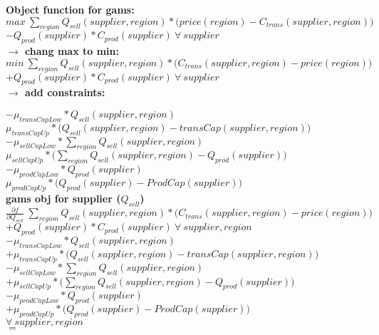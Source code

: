 \documentclass{article}
\begin{document}
\textbf{Object function for gams:}\\
\quad$ max\:\sum_{region} Q_{sell}(supplier, region) *\Big(price(region) - C_{trans}(supplier,region)\Big) $\\
\quad$- Q_{prod}(supplier)*C_{prod}(supplier)\:\forall\: supplier $\\

\textbf{$\rightarrow$ chang max to min:}\\

\quad$ min\:\sum_{region} Q_{sell}(supplier, region) *\Big(C_{trans}(supplier,region) - price(region)\Big) $\\
\quad$+ Q_{prod}(supplier)*C_{prod}(supplier)\:\forall\: supplier$ \\

\textbf{$\rightarrow$ add constraints:}

\quad$	- \mu_{transCapLow} * Q_{sell}(supplier, region)$\\
\quad$\mu_{transCapUp} *\Big( Q_{sell}(supplier, region) - transCap(supplier, region)\Big)$\\
\quad$ -\mu_{sellCapLow} * \sum_{region} Q_{sell}(supplier, region)$\\
\quad$	 \mu_{sellCapUp}*\Big(\sum_{region} Q_{sell}(supplier, region) -  Q_{prod}(supplier) \Big)$\\
\quad$	- \mu_{prodCapLow} * Q_{prod}(supplier)$\\
\quad$ \mu_{prodCapUp}*\Big(Q_{prod}(supplier) - ProdCap(supplier)\Big)	$\\


	



\textbf{gams obj for supplier ($Q_{sell}$)}\\
\quad$\frac{\partial f}{\partial Q_{sell}} \:\sum_{region} Q_{sell}(supplier, region) *\Big(C_{trans}(supplier,region) - price(region)\Big)$\\
\quad$+Q_{prod}(supplier)*C_{prod}(supplier)\: \forall \:supplier,region$\\
\quad$-\mu_{transCapLow} * Q_{sell}(supplier, region)$\\
\quad$+\mu_{transCapUp} *\Big( Q_{sell}(supplier, region) - transCap(supplier, region)\Big)$\\
\quad$-\mu_{sellCapLow} * \sum_{region} Q_{sell}(supplier, region)$\\
\quad$+\mu_{sellCapUp}*\Big(\sum_{region} Q_{sell}(supplier, region) -  Q_{prod}(supplier) \Big) $\\
\quad$-\mu_{prodCapLow} * Q_{prod}(supplier)$\\
\quad$+\mu_{prodCapUp}*\Big(Q_{prod}(supplier) - ProdCap(supplier)\Big)$\\
\quad$\forall \:supplier,region$\\
\quad$=$
\end{document}
